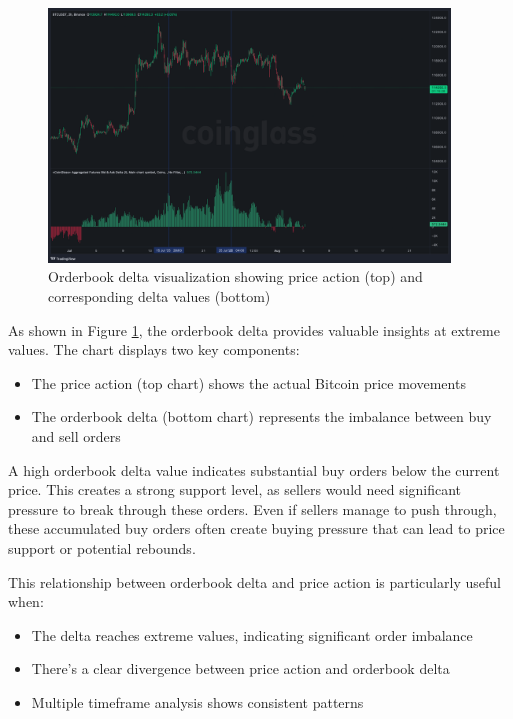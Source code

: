 \documentclass[12pt]{article}
\begin{document}
\begin{figure}[h]
    \centering
    \includegraphics[width=0.95\textwidth]{imgs/showcase_chart.png}
    \caption{Orderbook delta visualization showing price action (top) and corresponding delta values (bottom)}
    \label{fig:orderbook_delta}
\end{figure}

As shown in Figure \ref{fig:orderbook_delta}, the orderbook delta provides valuable insights at extreme values. The chart displays two key components:
\begin{itemize}
    \item The price action (top chart) shows the actual Bitcoin price movements
    \item The orderbook delta (bottom chart) represents the imbalance between buy and sell orders
\end{itemize}

A high orderbook delta value indicates substantial buy orders below the current price. This creates a strong support level, as sellers would need significant pressure to break through these orders. Even if sellers manage to push through, these accumulated buy orders often create buying pressure that can lead to price support or potential rebounds.

This relationship between orderbook delta and price action is particularly useful when:
\begin{itemize}
    \item The delta reaches extreme values, indicating significant order imbalance
    \item There's a clear divergence between price action and orderbook delta
    \item Multiple timeframe analysis shows consistent patterns
\end{itemize}
\end{document}
